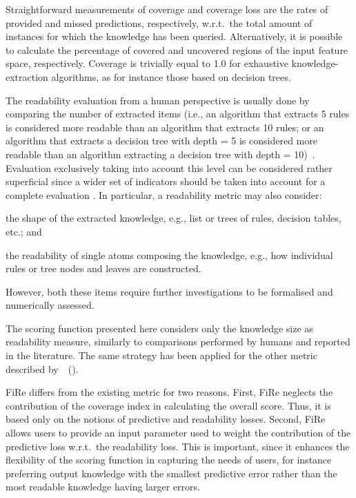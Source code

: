 \documentclass{article}
\newcommand{\citet}[1]{\citeauthor{#1}~(\citeyear{#1})}
\newcommand{\fire}{FiRe}
\newenvironment{inlinelist}{\begin{enumerate*}[label=\emph{(\roman{*})}]}{\end{enumerate*}}
\begin{document}
Straightforward measurements of coverage and coverage loss are the rates of provided and missed predictions, respectively, w.r.t.\ the total amount of instances for which the knowledge has been queried.
%
Alternatively, it is possible to calculate the percentage of covered and uncovered regions of the input feature space, respectively.
%
Coverage is trivially equal to 1.0 for exhaustive knowledge-extraction algorithms, as for instance those based on decision trees.

The readability evaluation from a human perspective is usually done by comparing the number of extracted items (i.e., an algorithm that extracts 5 rules is considered more readable than an algorithm that extracts 10 rules; or an algorithm that extracts a decision tree with depth = 5 is considered more readable than an algorithm extracting a decision tree with depth = 10)~\cite{czarnowski2016}.
% 
Evaluation exclusively taking into account this level can be considered rather superficial since a wider set of indicators should be taken into account for a complete evaluation \cite{sabbatini2022-metrics}.
%
In particular, a readability metric may also consider:
%
\begin{inlinelist}
	\item the shape of the extracted knowledge, e.g., list or trees of rules, decision tables, etc.; and
	\item the readability of single atoms composing the knowledge, e.g., how individual rules or tree nodes and leaves are constructed.
\end{inlinelist}
%
However, both these items require further investigations to be formalised and numerically assessed.

The scoring function presented here considers only the knowledge size as readability measure, similarly to comparisons performed by humans and reported in the literature.
%
The same strategy has been applied for the other metric described by~\citet{skemetrics-aaai2023}.

\fire{} differs from the existing metric for two reasons.
%
First, \fire{} neglects the contribution of the coverage index in calculating the overall score.
%
Thus, it is based only on the notions of predictive and readability losses.
%
Second, \fire{} allows users to provide an input parameter used to weight the contribution of the predictive loss w.r.t.\ the readability loss.
%
This is important, since it enhances the flexibility of the scoring function in capturing the needs of users, for instance preferring output knowledge with the smallest predictive error rather than the most readable knowledge having larger errors.
\end{document}
